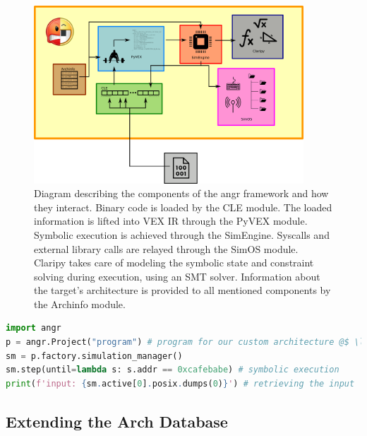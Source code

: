 \begin{figure}[ht]
    \centering
    \includegraphics[width=0.9\textwidth]{./images/angr.png}
    \caption{Diagram describing the components of the angr framework and how they interact. Binary code is loaded by the CLE module. The loaded information is lifted into VEX \gls{IR} through the PyVEX module. Symbolic execution is achieved through the SimEngine. Syscalls and external library calls are relayed through the SimOS module. Claripy takes care of modeling the symbolic state and constraint solving during execution, using an \gls{SMT} solver. Information about the target's architecture is provided to all mentioned components by the Archinfo module. \cite{angr} }
    \label{fig:angr}
\end{figure}

\begin{lstlisting}[language=python, label={lst:angr_ex}, caption={A minimal angr code sample. We load a program into \cc{p}, create a simulation manager, symbolically execute the program until we reach the desired address \cc{0xcafebabe}, and finally print the input which determined this execution path.}]
import angr
p = angr.Project("program") # program for our custom architecture @$ \label{line:project} $@
sm = p.factory.simulation_manager()
sm.step(until=lambda s: s.addr == 0xcafebabe) # symbolic execution
print(f'input: {sm.active[0].posix.dumps(0)}') # retrieving the input
\end{lstlisting}

\subsection{Extending the Arch Database}

